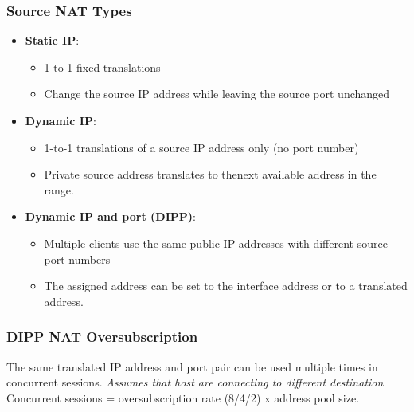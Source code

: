 \subsubsection{Source NAT Types}
    \begin{itemize}
        \item \textbf{Static IP}:
            \begin{itemize}
                \item 1-to-1 fixed translations
                \item Change the source IP address while leaving the source port unchanged
            \end{itemize}
        \item \textbf{Dynamic IP}:
            \begin{itemize}
                \item 1-to-1 translations of a source IP address only (no port number)
                \item Private source address translates to thenext available address in the range.
            \end{itemize}
        \item \textbf{Dynamic IP and port (DIPP)}:
            \begin{itemize}
                \item Multiple clients use the same public IP addresses with different source port numbers
                \item The assigned address can be set to the interface address or to a translated address.
            \end{itemize}
    \end{itemize}

\subsubsection{DIPP NAT Oversubscription}
The same translated IP address and port pair can be used multiple times in concurrent sessions. \textit{Assumes that host are connecting to different destination} Concurrent sessions = oversubscription rate (8/4/2) x address pool size.

